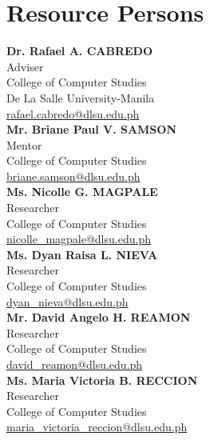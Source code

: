 %
%
%                 

\chapter{Resource Persons}
\label{sec:appendixd}

%
%
%
%

%
%
\newcommand{\resperson}[4]{\textbf{#1} \\ #2 \\ #3 \\ \url{#4}\vspace{0.5em}\\}

\resperson{Dr. Rafael A. CABREDO}{Adviser}{College of Computer Studies\\De La Salle University-Manila}{rafael.cabredo@dlsu.edu.ph}
\resperson{Mr. Briane Paul V. SAMSON}{Mentor}{College of Computer Studies}{briane.samson@dlsu.edu.ph}
\resperson{Ms. Nicolle G. MAGPALE}{Researcher}{College of Computer Studies}{nicolle_magpale@dlsu.edu.ph}
\resperson{Ms. Dyan Raisa L. NIEVA}{Researcher}{College of Computer Studies}{dyan_nieva@dlsu.edu.ph}
\resperson{Mr. David Angelo H. REAMON}{Researcher}{College of Computer Studies}{david_reamon@dlsu.edu.ph}
\resperson{Ms. Maria Victoria B. RECCION}{Researcher}{College of Computer Studies}{maria_victoria_reccion@dlsu.edu.ph}


